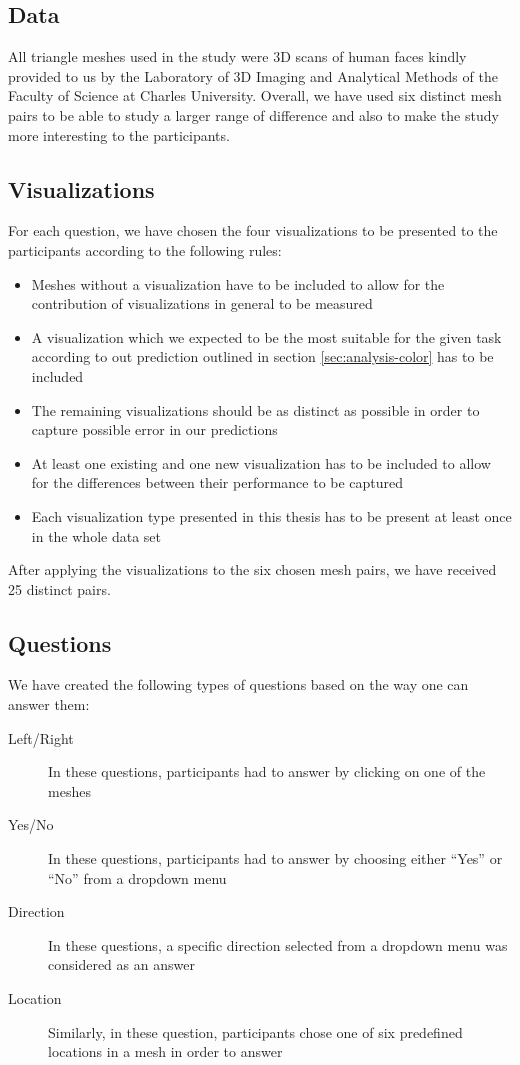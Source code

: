 \subsection{Data}

All triangle meshes used in the study were 3D scans of human faces kindly provided to us by the Laboratory of 3D Imaging and Analytical Methods of the Faculty of Science at Charles University. Overall, we have used six distinct mesh pairs to be able to study a larger range of difference and also to make the study more interesting to the participants.

\subsection{Visualizations}

For each question, we have chosen the four visualizations to be presented to the participants according to the following rules:

\begin{itemize}
\item Meshes without a visualization have to be included to allow for the contribution of visualizations in general to be measured
\item A visualization which we expected to be the most suitable for the given task according to out prediction outlined in section \ref{sec:analysis-color} has to be included
\item The remaining visualizations should be as distinct as possible in order to capture possible error in our predictions
\item At least one existing and one new visualization has to be included to allow for the differences between their performance to be captured
\item Each visualization type presented in this thesis has to be present at least once in the whole data set
\end{itemize}

After applying the visualizations to the six chosen mesh pairs, we have received 25 distinct pairs.

\subsection{Questions}

We have created the following types of questions based on the way one can answer them:

\begin{description}
\item [Left/Right] In these questions, participants had to answer by clicking on one of the meshes
\item [Yes/No] In these questions, participants had to answer by choosing either ``Yes'' or ``No'' from a dropdown menu
\item [Direction] In these questions, a specific direction selected from a dropdown menu was considered as an answer
\item [Location] Similarly, in these question, participants chose one of six predefined locations in a mesh in order to answer
\end{description}

